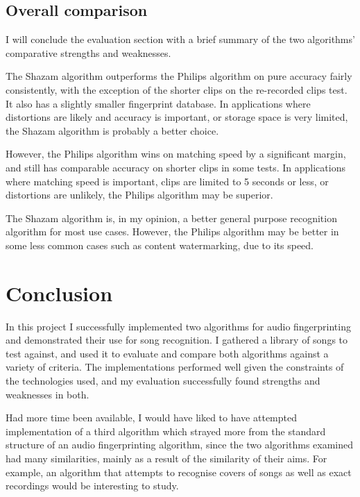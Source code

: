 \documentclass[12pt,a4paper,twoside,openright]{report}
\begin{document}
\section{Overall comparison}

I will conclude the evaluation section with a brief summary of the two algorithms' comparative strengths and weaknesses.

The Shazam algorithm outperforms the Philips algorithm on pure accuracy fairly consistently, with the exception of the shorter clips on the re-recorded clips test. It also has a slightly smaller fingerprint database. In applications where distortions are likely and accuracy is important, or storage space is very limited, the Shazam algorithm is probably a better choice.

However, the Philips algorithm wins on matching speed by a significant margin, and still has comparable accuracy on shorter clips in some tests. In applications where matching speed is important, clips are limited to 5 seconds or less, or distortions are unlikely, the Philips algorithm may be superior. 

The Shazam algorithm is, in my opinion, a better general purpose recognition algorithm for most use cases. However, the Philips algorithm may be better in some less common cases such as content watermarking, due to its speed.



\chapter{Conclusion}
\label{conclusion}

In this project I successfully implemented two algorithms for audio fingerprinting and demonstrated their use for song recognition. I gathered a library of songs to test against, and used it to evaluate and compare both algorithms against a variety of criteria. The implementations performed well given the constraints of the technologies used, and my evaluation successfully found strengths and weaknesses in both.

Had more time been available, I would have liked to have attempted implementation of a third algorithm which strayed more from the standard structure of an audio fingerprinting algorithm, since the two algorithms examined had many similarities, mainly as a result of the similarity of their aims. For example, an algorithm that attempts to recognise covers of songs as well as exact recordings would be interesting to study.
\end{document}

